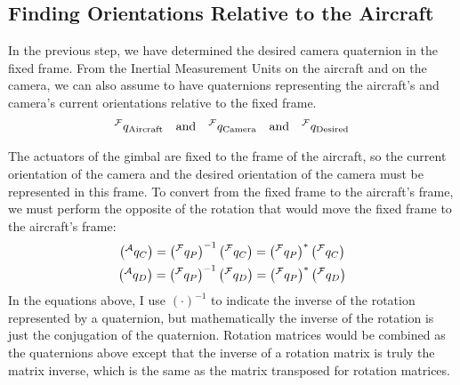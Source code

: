 \documentclass[letterpaper,10pt]{article}
\newcommand\leftidx[3]{%
  {\vphantom{#2}}#1#2#3%
}
\begin{document}
\subsection{Finding Orientations Relative to the Aircraft}
In the previous step, we have determined the desired camera quaternion in the fixed frame. From the Inertial Measurement Units on the aircraft and on the camera, we can also assume to have quaternions representing the aircraft's and camera's current orientations relative to the fixed frame.
\begin{gather*}
\leftidx{^\mathcal{F}}{q}{_\text{Aircraft}} \quad \text{and} \quad \leftidx{^\mathcal{F}}{q}{_\text{Camera}} \quad \text{and} \quad \leftidx{^\mathcal{F}}{q}{_\text{Desired}}
\end{gather*}

The actuators of the gimbal are fixed to the frame of the aircraft, so the current orientation of the camera and the desired orientation of the camera must be represented in this frame. To convert from the fixed frame to the aircraft's frame, we must perform the opposite of the rotation that would move the fixed frame to the aircraft's frame:
\begin{gather}
\left(\leftidx{^\mathcal{A}}{q}{_{C}}\right) = \left(\leftidx{^\mathcal{F}}{q}{_P}\right)^{-1} \left(\leftidx{^\mathcal{F}}{q}{_{C}}\right) = \left(\leftidx{^\mathcal{F}}{q}{_P}\right)^* \left(\leftidx{^\mathcal{F}}{q}{_{C}}\right) \\
\left(\leftidx{^\mathcal{A}}{q}{_{D}}\right) = \left(\leftidx{^\mathcal{F}}{q}{_P}\right)^{-1} \left(\leftidx{^\mathcal{F}}{q}{_{D}}\right) = \left(\leftidx{^\mathcal{F}}{q}{_P}\right)^* \left(\leftidx{^\mathcal{F}}{q}{_{D}}\right)
\end{gather}
In the equations above, I use $\left(\cdot\right)^{-1}$ to indicate the inverse of the rotation represented by a quaternion, but mathematically the inverse of the rotation is just the conjugation of the quaternion. Rotation matrices would be combined as the quaternions above except that the inverse of a rotation matrix is truly the matrix inverse, which is the same as the matrix transposed for rotation matrices. 
\end{document}

